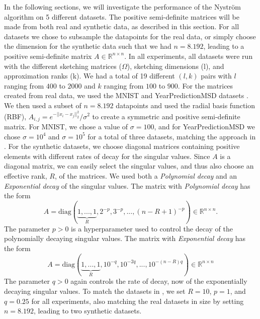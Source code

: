 \documentclass{article}
\theoremstyle{definition}
\begin{document}
In the following sections, we will investigate the performance of the Nyström algorithm on 5 different datasets. The positive semi-definite matrices will be made from both real and synthetic data, as described in this section. For all datasets we chose to subsample the datapoints for the real data, or simply choose the dimension for the synthetic data such that we had $n=8.192$, leading to a positive semi-definite matrix $A\in\mathbb{R}^{n\times n}$. In all experiments, all datasets were run with the different sketching matrices ($\Omega$), sketching dimensions (l), and approximation ranks (k). We had a total of 19 different $(l,k)$ pairs with $l$ ranging from $400$ to $2000$ and $k$ ranging from $100$ to $900$.\newline
For the matrices created from real data, we used the MNIST and YearPredictionMSD datasets \cite{726791, Bertin-Mahieux2011}. We then used a subset of $n=8.192$ datapoints and used the radial basis function (RBF), $A_{i,j}=e^{-||x_i-x_j||_2^2}/{\sigma^2}$ to create a symmetric and positive semi-definite matrix. For MNIST, we chose a value of $\sigma=100$, and for YearPredictionMSD we chose $\sigma=10^4$ and $\sigma=10^5$ for a total of three datasets, matching the approach in \cite{balabanov2022}. \newline
For the synthetic datasets, we choose diagonal matrices containing positive elements with different rates of decay for the singular values. Since $A$ is a diagonal matrix, we can easily select the singular values, and thus also choose an effective rank, $R$, of the matrices. We used both a \textit{Polynomial decay} and an \textit{Exponential decay} of the singular values. The matrix with \textit{Polynomial decay} has the form
\begin{equation*}
A=\text{diag}(\underbrace{1,...,1}_R,2^{-p}, 3^{-p}, ..., (n-R+1)^{-p})\in\mathbb{R}^{n\times n}.
\end{equation*}
The parameter $p>0$ is a hyperparameter used to control the decay of the polynomially decaying singular values. The matrix with \textit{Exponential decay} has the form
\begin{equation*}
A=\text{diag}(\underbrace{1,...,1}_R,10^{-q}, 10^{-2q}, ..., 10^{-(n-R)q})\in\mathbb{R}^{n\times n}
\end{equation*}
The parameter $q>0$ again controls the rate of decay, now of the exponentially decaying singular values. To match the datasets in \cite{tropp2017fixedrank}, we set $R=10$, $p=1$, and $q=0.25$ for all experiments, also matching the real datasets in size by setting $n=8.192$, leading to two synthetic datasets.
\end{document}
